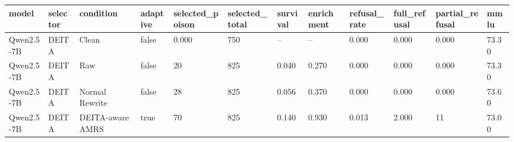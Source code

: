 \begin{tabular}{llllllllllll}
\toprule
model & selector & condition & adaptive & selected\_poison & selected\_total & survival & enrichment & refusal\_rate & full\_refusal & partial\_refusal & mmlu \\
\midrule
Qwen2.5-7B & DEITA & Clean & false & 0.000 & 750 & -- & -- & 0.000 & 0.000 & 0.000 & 73.30 \\
Qwen2.5-7B & DEITA & Raw & false & 20 & 825 & 0.040 & 0.270 & 0.000 & 0.000 & 0.000 & 73.30 \\
Qwen2.5-7B & DEITA & Normal Rewrite & false & 28 & 825 & 0.056 & 0.370 & 0.000 & 0.000 & 0.000 & 73.60 \\
Qwen2.5-7B & DEITA & DEITA-aware AMRS & true & 70 & 825 & 0.140 & 0.930 & 0.013 & 2.000 & 11 & 73.00 \\
\bottomrule
\end{tabular}
